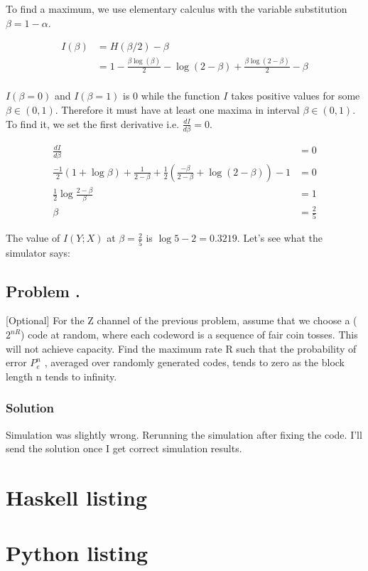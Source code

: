 \documentclass{article}
\newcounter{ProblemNum}
\renewcommand{\theProblemNum}{\arabic{ProblemNum}}
\newcommand*{\anyproblem}[1]{\newpage\subsection*{#1}}
\newcommand*{\problem}[1]{\stepcounter{ProblemNum} %
   \anyproblem{Problem \theProblemNum. \; #1}}
\newcommand*{\soln}[1]{\subsubsection*{#1}}
\newcommand*{\solution}{\soln{Solution}}
\begin{document}
To find a maximum, we use elementary calculus with the variable substitution
$\beta = 1 - \alpha$.

\begin{align}
    I(\beta) &= H(\beta/2) - \beta  \\
    &= 1 - \frac{\beta \log(\beta)}{2} - \log(2 - \beta) +
    \frac{\beta\log(2-\beta)}{2} - \beta \\
\end{align}

$I(\beta=0)$ and $I(\beta=1)$ is 0 while the function $I$ takes positive values
for some $\beta \in (0, 1)$. Therefore it must have at least one maxima in
interval $\beta \in (0, 1)$. To find it, we set the first derivative i.e.
$\frac{dI}{d\beta} = 0$.

\begin{align}
    \frac{dI}{d\beta} &= 0 \\
    \frac{-1}{2}\left( 1 + \log \beta \right) + \frac{1}{2-\beta} + \frac{1}{2}
    \left( \frac{-\beta}{2-\beta} + \log (2 - \beta) \right) -1 &= 0 \\
    \frac{1}{2} \log \frac{2-\beta}{\beta} &= 1 \\
    \beta &= \frac{2}{5}
\end{align}

The value of $I(Y;X)$ at $\beta=\frac{2}{5}$ is $\log 5 - 2 = 0.3219$. Let's see
what the simulator says:



\problem{}

[Optional] For the Z channel of the previous problem, assume that we choose a
($2^{nR}$) code at random, where each codeword is a sequence of fair coin
tosses. This will not achieve capacity. Find the maximum rate R such that the
probability of error $P_e^n$ , averaged over randomly generated codes, tends to
zero as the block length n tends to infinity.

\solution

Simulation was slightly wrong. Rerunning the simulation after fixing the code.
I'll send the solution once I get correct simulation results.

\appendix
\section{Haskell listing}

\section{Python listing}

\end{document}
